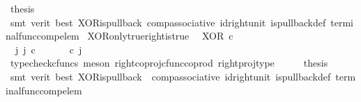 \begin{isabellebody}
\ {\isacharquery}{\kern0pt}thesis\isanewline
\ \ \ \ \isamarkupfalse%
\ {\isacharparenleft}{\kern0pt}smt\ {\isacharparenleft}{\kern0pt}verit{\isacharcomma}{\kern0pt}\ best{\isacharparenright}{\kern0pt}\ XOR{\isacharunderscore}{\kern0pt}is{\isacharunderscore}{\kern0pt}pullback\ comp{\isacharunderscore}{\kern0pt}associative{}\ id{\isacharunderscore}{\kern0pt}right{\isacharunderscore}{\kern0pt}unit{}\ is{\isacharunderscore}{\kern0pt}pullback{\isacharunderscore}{\kern0pt}def\ terminal{\isacharunderscore}{\kern0pt}func{\isacharunderscore}{\kern0pt}comp{\isacharunderscore}{\kern0pt}elem{\isacharparenright}{\kern0pt}\isanewline
{}\isamarkupfalse%
%
\endisatagproof
{\isafoldproof}%
%
\isadelimproof
\isanewline
%
\endisadelimproof
\isanewline
{}\isamarkupfalse%
\ XOR{\isacharunderscore}{\kern0pt}only{\isacharunderscore}{\kern0pt}true{\isacharunderscore}{\kern0pt}right{\isacharunderscore}{\kern0pt}is{\isacharunderscore}{\kern0pt}true{\isacharcolon}{\kern0pt}\isanewline
\ \ {\isachardoublequoteopen}XOR\ {\isasymcirc}\isactrlsub c\ \ {\isasymlangle}{\isasymf}{\isacharcomma}{\kern0pt}{\isasymt}{\isasymrangle}\ {\isacharequal}{\kern0pt}\ {\isasymt}{\isachardoublequoteclose}\isanewline
%
\isadelimproof
%
\endisadelimproof
%
\isatagproof
{}\isamarkupfalse%
\ {\isacharminus}{\kern0pt}\ \ \ \isanewline
\ \ \isamarkupfalse%
\ {\isachardoublequoteopen}{\isasymexists}\ j{\isachardot}{\kern0pt}\ j\ {\isasymin}\isactrlsub c\ {\isasymone}{\isasymCoprod}{\isasymone}\ {\isasymand}\ {\isacharparenleft}{\kern0pt}{\isasymlangle}{\isasymt}{\isacharcomma}{\kern0pt}\ {\isasymf}{\isasymrangle}\ {\isasymamalg}{\isasymlangle}{\isasymf}{\isacharcomma}{\kern0pt}\ {\isasymt}{\isasymrangle}{\isacharparenright}{\kern0pt}\ {\isasymcirc}\isactrlsub c\ j\ \ {\isacharequal}{\kern0pt}\ {\isasymlangle}{\isasymf}{\isacharcomma}{\kern0pt}{\isasymt}{\isasymrangle}{\isachardoublequoteclose}\isanewline
\ \ \ \ \isamarkupfalse%
\ {\isacharparenleft}{\kern0pt}typecheck{\isacharunderscore}{\kern0pt}cfuncs{\isacharcomma}{\kern0pt}\ meson\ right{\isacharunderscore}{\kern0pt}coproj{\isacharunderscore}{\kern0pt}cfunc{\isacharunderscore}{\kern0pt}coprod\ right{\isacharunderscore}{\kern0pt}proj{\isacharunderscore}{\kern0pt}type{\isacharparenright}{\kern0pt}\isanewline
\ \ \isamarkupfalse%
\ \isamarkupfalse%
\ {\isacharquery}{\kern0pt}thesis\isanewline
\ \ \ \ \isamarkupfalse%
\ {\isacharparenleft}{\kern0pt}smt\ {\isacharparenleft}{\kern0pt}verit{\isacharcomma}{\kern0pt}\ best{\isacharparenright}{\kern0pt}\ XOR{\isacharunderscore}{\kern0pt}is{\isacharunderscore}{\kern0pt}pullback\ \ comp{\isacharunderscore}{\kern0pt}associative{}\ id{\isacharunderscore}{\kern0pt}right{\isacharunderscore}{\kern0pt}unit{}\ is{\isacharunderscore}{\kern0pt}pullback{\isacharunderscore}{\kern0pt}def\ terminal{\isacharunderscore}{\kern0pt}func{\isacharunderscore}{\kern0pt}comp{\isacharunderscore}{\kern0pt}elem{\isacharparenright}{\kern0pt}\isanewline

\end{isabellebody}
